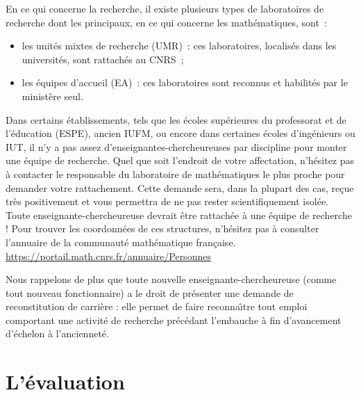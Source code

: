 En ce qui concerne la recherche, il existe plusieurs types de
laboratoires de recherche dont les principaux, en ce qui concerne
les math\'ematiques, sont~:
\begin{itemize}
	\item les unit\'es mixtes de recherche (UMR)~: ces laboratoires,
		localis\'es dans les universit\'es, sont rattach\'es au CNRS~;
	\item les \'equipes d'accueil (EA)~: ces laboratoires sont
		reconnus et habilit\'es par le minist\`ere seul.
\end{itemize}

Dans certains \'etablissements, tels que 
les \'ecoles sup\'erieures du professorat et de l'\'education (ESPE), ancien IUFM,
ou encore dans
certaines \'ecoles d'ing\'enieurs ou IUT, il n'y a pas assez
d'enseignant\mp e\mp s-chercheur\mp euse\mp s par discipline pour monter une \'equipe de
recherche.
Quel que soit l'endroit de votre affectation, n'h\'esitez pas
\`a contacter le responsable du laboratoire de math\'e\-matiques le plus
proche pour demander votre rattachement. Cette demande sera, dans la
plupart des cas, re\c cue tr\`es positivement et vous permettra de ne
pas rester scientifiquement isol\'e\mp e. Tout\mp e enseignant\mp e-chercheur\mp euse
devrait \^etre rattach\'e\mp e \`a une \'equipe de
recherche ! Pour trouver les coordonn\'ees de ces structures, n'h\'esitez pas \`a
consulter l'annuaire de la communaut\'e math\'e\-matique
fran\c caise. \url{https://portail.math.cnrs.fr/annuaire/Personnes}

Nous rappelons de plus que tout\mp e nouvel\mp le enseignant\mp e-chercheur\mp euse (comme tout nouveau fonctionnaire)
a le droit de pr\'esenter une demande de reconstitution de carri\`ere : elle permet de faire reconna\^\i tre tout emploi comportant une activit\'e de recherche pr\'ec\'edant l'embauche \`a fin d'avancement d'\'echelon \`a l'anciennet\'e.

\section{L'\'evaluation}

